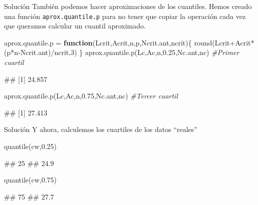 \documentclass[
  ignorenonframetext,
  aspectratio=169]{beamer}
\newenvironment{Shaded}{\begin{snugshade}}{\end{snugshade}}
\newcommand{\CommentTok}[1]{\textcolor[rgb]{0.56,0.35,0.01}{\textit{#1}}}
\newcommand{\ControlFlowTok}[1]{\textcolor[rgb]{0.13,0.29,0.53}{\textbf{#1}}}
\newcommand{\DecValTok}[1]{\textcolor[rgb]{0.00,0.00,0.81}{#1}}
\newcommand{\FloatTok}[1]{\textcolor[rgb]{0.00,0.00,0.81}{#1}}
\newcommand{\FunctionTok}[1]{\textcolor[rgb]{0.00,0.00,0.00}{#1}}
\newcommand{\NormalTok}[1]{#1}
\newcommand{\OtherTok}[1]{\textcolor[rgb]{0.56,0.35,0.01}{#1}}
\newcommand{\SpecialCharTok}[1]{\textcolor[rgb]{0.00,0.00,0.00}{#1}}
\let\oldverbatim\verbatim
\let\endoldverbatim\endverbatim
\renewenvironment{verbatim}{\tiny\oldverbatim}{\endoldverbatim}
\begin{document}
\begin{frame}[fragile]{Solución}
\protect\hypertarget{soluciuxf3n-35}{}
También podemos hacer aproximaciones de los cuantiles. Hemos creado una
función \texttt{aprox.quantile.p} para no tener que copiar la operación
cada vez que queramos calcular un cuantil aproximado.

\begin{Shaded}
\begin{Highlighting}[]
\NormalTok{aprox.quantile.p }\OtherTok{=} \ControlFlowTok{function}\NormalTok{(Lcrit,Acrit,n,p,Ncrit.ant,ncrit)\{}
  \FunctionTok{round}\NormalTok{(Lcrit}\SpecialCharTok{+}\NormalTok{Acrit}\SpecialCharTok{*}\NormalTok{(p}\SpecialCharTok{*}\NormalTok{n}\SpecialCharTok{{-}}\NormalTok{Ncrit.ant)}\SpecialCharTok{/}\NormalTok{ncrit,}\DecValTok{3}\NormalTok{)}
\NormalTok{\}}
\FunctionTok{aprox.quantile.p}\NormalTok{(Lc,Ac,n,}\FloatTok{0.25}\NormalTok{,Nc.ant,nc) }\CommentTok{\#Primer cuartil}
\end{Highlighting}
\end{Shaded}

\begin{verbatim}
## [1] 24.857
\end{verbatim}

\begin{Shaded}
\begin{Highlighting}[]
\FunctionTok{aprox.quantile.p}\NormalTok{(Lc,Ac,n,}\FloatTok{0.75}\NormalTok{,Nc.ant,nc) }\CommentTok{\#Tercer cuartil}
\end{Highlighting}
\end{Shaded}

\begin{verbatim}
## [1] 27.413
\end{verbatim}
\end{frame}

\begin{frame}[fragile]{Solución}
\protect\hypertarget{soluciuxf3n-36}{}
Y ahora, calculemos los cuartiles de los datos ``reales''

\begin{Shaded}
\begin{Highlighting}[]
\FunctionTok{quantile}\NormalTok{(cw,}\FloatTok{0.25}\NormalTok{)}
\end{Highlighting}
\end{Shaded}

\begin{verbatim}
##  25% 
## 24.9
\end{verbatim}

\begin{Shaded}
\begin{Highlighting}[]
\FunctionTok{quantile}\NormalTok{(cw,}\FloatTok{0.75}\NormalTok{)}
\end{Highlighting}
\end{Shaded}

\begin{verbatim}
##  75% 
## 27.7
\end{verbatim}
\end{frame}
\end{document}
